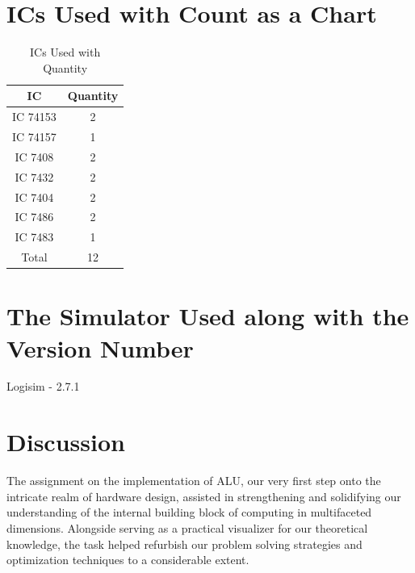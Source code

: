 \documentclass{article}
\begin{document}
\newpage




	
\section{\large{ICs Used with Count as a Chart}}

\begin{table}[!h]
	\centering
	\begin{tabular}{|c|c|}
		\hline
		\textbf{IC} & \textbf{Quantity}  \\
		\hline
		IC 74153 & 2 \\
		IC 74157 & 1 \\
		IC 7408 & 2 \\
		IC 7432 & 2 \\
		IC 7404 & 2 \\
		IC 7486 & 2 \\
		IC 7483 & 1 \\
		\hline
		Total & 12  \\
		\hline
	\end{tabular}
	\caption{ICs Used with Quantity}
	\label{tab:ic_quantity}
\end{table}









\vspace{5mm}
\section{The Simulator Used along with the Version Number}
Logisim - 2.7.1
 \newpage

\section{Discussion}


The assignment on the implementation of ALU, our very first step onto the intricate realm of hardware design, assisted in strengthening and solidifying our understanding of the internal building block of computing in multifaceted dimensions. Alongside serving as a practical visualizer for our theoretical knowledge, the task helped refurbish our problem solving strategies and optimization techniques to a considerable extent.

\vspace{2mm}
\end{document}
